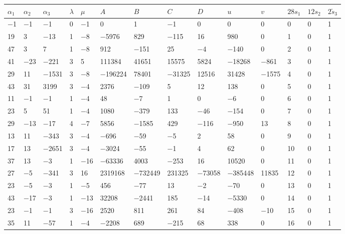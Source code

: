 \documentclass[10pt,a4paper]{amsart}
\numberwithin{equation}{section}
\theoremstyle{definition}
\numberwithin{table}{section}
\begin{document}
{\begin{paracol}{3}
		\begin{supertabular}{|w{c}{.32cm}w{c}{.32cm}w{c}{.32cm}@{\hspace{.5cm}}w{c}{.2cm}w{c}{.2cm}|@{\hspace{\tabcolsep}}HHHHHHw{c}{.17cm}w{c}{.17cm}w{c}{.17cm}|}
			\hline $\alpha_1$ & $\alpha_2$ & $\alpha_3$ & $\lambda$ & $\mu$ & $A$ & $B$ & $C$ & $D$ & $u$ & $v$ & $28s_1$ & $12s_2$ & $2\tilde{s}_3$ \\ \hline
			$-$1 & $-$1 & $-$1 & 0 & $-$1 & 0 & 1 & $-$1 & 0 & 0 & 0 & 0 & 0 & 1 \\
			19 & 3 & $-$13 & 1 & $-$8 & $-$5976 & 829 & $-$115 & 16 & 980 & 0 & 1 & 0 & 1 \\
			47 & 3 & 7 & 1 & $-$8 & 912 & $-$151 & 25 & $-$4 & $-$140 & 0 & 2 & 0 & 1 \\
			41 & $-$23 & $-$221 & 3 & 5 & 111384 & 41651 & 15575 & 5824 & $-$18268 & $-$861 & 3 & 0 & 1 \\
			29 & 11 & $-$1531 & 3 & $-$8 & $-$196224 & 78401 & $-$31325 & 12516 & 31428 & $-$1575 & 4 & 0 & 1 \\
			43 & 31 & 3199 & 3 & $-$4 & 2376 & $-$109 & 5 & 12 & 138 & 0 & 5 & 0 & 1 \\
			11 & $-$1 & $-$1 & 1 & $-$4 & 48 & $-$7 & 1 & 0 & $-$6 & 0 & 6 & 0 & 1 \\
			23 & 5 & 51 & 1 & $-$4 & 1080 & $-$379 & 133 & $-$46 & $-$154 & 0 & 7 & 0 & 1 \\
			29 & $-$13 & $-$17 & 4 & $-$7 & 5856 & $-$1585 & 429 & $-$116 & $-$950 & 13 & 8 & 0 & 1 \\
			13 & 11 & $-$343 & 3 & $-$4 & $-$696 & $-$59 & $-$5 & 2 & 58 & 0 & 9 & 0 & 1 \\
			17 & 13 & $-$2651 & 3 & $-$4 & $-$3024 & $-$55 & $-$1 & 4 & 62 & 0 & 10 & 0 & 1 \\
			37 & 13 & $-$3 & 1 & $-$16 & $-$63336 & 4003 & $-$253 & 16 & 10520 & 0 & 11 & 0 & 1 \\
			27 & $-$5 & $-$341 & 3 & 16 & 2319168 & $-$732449 & 231325 & $-$73058 & $-$385448 & 11835 & 12 & 0 & 1 \\
			23 & $-$5 & $-$3 & 1 & $-$5 & 456 & $-$77 & 13 & $-$2 & $-$70 & 0 & 13 & 0 & 1 \\
			43 & $-$17 & $-$3 & 1 & $-$13 & 32208 & $-$2441 & 185 & $-$14 & $-$5330 & 0 & 14 & 0 & 1 \\
			23 & $-$1 & $-$1 & 3 & $-$16 & 2520 & 811 & 261 & 84 & $-$408 & $-$10 & 15 & 0 & 1 \\
			35 & 11 & $-$57 & 1 & $-$4 & $-$2208 & 689 & $-$215 & 68 & 338 & 0 & 16 & 0 & 1 \\

\end{supertabular}
\end{paracol}}
\end{document}
